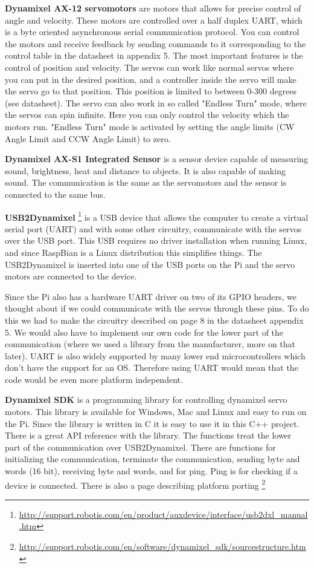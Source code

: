 \textbf{Dynamixel AX-12 servomotors}
are motors that allows for precise control of angle and velocity. These motors are controlled over a half duplex UART, which is a byte oriented asynchronous serial communication protocol. You can control the motors and receive feedback by sending commands to it corresponding to the control table in the datasheet in appendix 5. The most important features is the control of position and velocity. The servos can work like normal servos where you can put in the desired position, and a controller inside the servo will make the servo go to that position. This position is limited to between 0-300 degrees (see datasheet). The servo can also work in so called "Endless Turn" mode, where the servos can spin infinite. Here you can only control the velocity which the motors run. "Endless Turn" mode is activated by setting the angle limits (CW Angle Limit and CCW Angle Limit) to zero.
\bigskip

\textbf{Dynamixel AX-S1 Integrated Sensor}
is a sensor device capable of measuring sound, brightness, heat and distance to objects. It is also capable of making sound. The communication is the same as the servomotors and the sensor is connected to the same bus. 
\bigskip

\textbf{USB2Dynamixel} \footnote{\url{http://support.robotis.com/en/product/auxdevice/interface/usb2dxl_manual.htm}} is a USB device that allows the computer to create a virtual serial port (UART) and with some other circuitry, communicate with the servos over the USB port.
This USB requires no driver installation when running Linux, and since RaspBian is a Linux distribution this simplifies things. 
The USB2Dynamixel is inserted into one of the USB ports on the Pi and the servo motors are connected to the device.

Since the Pi also has a hardware UART driver on two of its GPIO headers, we thought about if we could communicate with the servos through these pins. 
To do this we had to make the circuitry described on page 8 in the datasheet appendix 5. 
We would also have to implement our own code for the lower part of the communication (where we used a library from the manufacturer, more on that later).
UART is also widely supported by many lower end microcontrollers which don't have the support for an OS. 
Therefore using UART would mean that the code would be even more platform independent.
\bigskip

\textbf{Dynamixel SDK} is a programming library for controlling dynamixel servo motors. 
This library is available for Windows, Mac and Linux and easy to run on the Pi. 
Since the library is written in C it is easy to use it in this C++ project.
There is a great API reference \citep{dynamixel-API} with the library.
The functions treat the lower part of the communication over USB2Dynamixel.
There are functions for initializing the communication, terminate the communication, sending byte and words (16 bit), receiving byte and words, and for ping. Ping is for checking if a device is connected.
There is also a page describing platform porting \footnote{\url{http://support.robotis.com/en/software/dynamixel_sdk/sourcestructure.htm}}


